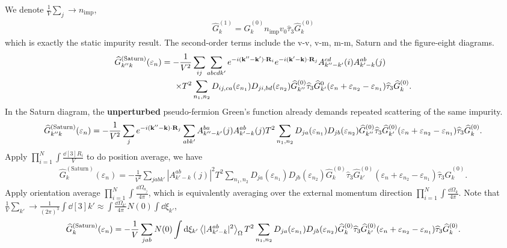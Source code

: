 \documentclass[]{article}
\begin{document}
We denote $\frac{1}{V}\sum_j\rightarrow n_\text{imp}$,
\begin{align}
    \widehat{G}^{(1)}_k = \widehat{G}^{(0)}_{k}n_\text{imp}v_0\widehat{\tau}_3\widehat{G}_k^{(0)}
\end{align}
which is exactly the static impurity result.
The second-order terms include the v-v, v-m, m-m, Saturn and the figure-eight diagrams.
\begin{align}\label{self-energy}
    \widehat{G}^{(\text{Saturn})}_{k''k}(\varepsilon_n)
    =-\frac{1}{V^2}&\sum_{ij}\sum_{abcdk'}
    e^{-i(\vb{k}''-\vb{k}')\cdot\vb{R}_i}
    e^{-i(\vb{k}'-\vb{k})\cdot\vb{R}_j}
    A_{k''-k'}^{cd}(i) A_{k'-k}^{ab}(j)\nonumber\\
    \times
    T^2&\sum_{n_1,n_2}
    D_{ij,ca}(\varepsilon_{n_1})D_{ji,bd}(\varepsilon_{n_2})
    \widehat{G}^{(0)}_{k''}\widehat{\tau}_3
    \widehat{G}^0_{k'}(\varepsilon_n+\varepsilon_{n_2}-\varepsilon_{n_1})
    \widehat{\tau}_3
    \widehat{G}^{(0)}_k.
\end{align}
In the Saturn diagram, the \textbf{unperturbed} pseudo-fermion Green's function already demands repeated scattering of the same impurity.
\begin{align}
    \widehat{G}^{(\text{Saturn})}_{k''k}(\varepsilon_n)
  =-\frac{1}{V^2}\sum_{j}e^{-i(\vb{k}''-\vb{k})\cdot\vb{R}_j}
  \sum_{abk'}
  A_{k''-k'}^{ba}(j)A_{k'-k}^{ab}(j)
  T^2\sum_{n_1,n_2}
  D_{ja}(\varepsilon_{n_1})D_{jb}(\varepsilon_{n_2})
  \widehat{G}^{(0)}_{k''}\widehat{\tau}_3
  \widehat{G}^{(0)}_{k'}(\varepsilon_n+\varepsilon_{n_2}-\varepsilon_{n_1})
  \widehat{\tau}_3
  \widehat{G}^{(0)}_k.
\end{align}
Apply $\prod_{i=1}^{N}\int\frac{\dd[3]{R_i}}{V}$ to do position average, we have
\begin{align}
    \widehat{G}^{(\text{Saturn})}_{k}(\varepsilon_n)
    = -\frac{1}{V^2}\sum_{jabk'}|A^{ab}_{k'-k}(j)|^2
    T^2\sum_{n_1,n_2}
    D_{ja}(\varepsilon_{n_1})D_{jb}(\varepsilon_{n_2})
    \widehat{G}^{(0)}_k\widehat{\tau}_3
    \widehat{G}^{(0)}_{k'}(\varepsilon_n+\varepsilon_{n_2}-\varepsilon_{n_1})
    \widehat{\tau}_3
    \widehat{G}^{(0)}_k.
\end{align}
Apply orientation average $\prod_{i=1}^{N}\int\frac{\dd\Omega_{a_j}}{4\pi}$,
which is equivalently averaging over the external momentum direction $\prod_{i=1}^{N}\int\frac{\dd\Omega_k}{4\pi}$.
Note that $\frac{1}{V}\sum_{k'}\rightarrow\frac{1}{(2\pi)^3}\int\dd[3]{k'}\approx\int\frac{\dd\Omega_{k'}}{4\pi}N(0)\int\dd\xi_{k'}$,
\begin{align}
    \widehat{G}^{(\text{Saturn})}_{k}(\varepsilon_n)
    = -\frac{1}{V}\sum_{jab}N(0)\int\dd\xi_{k'}
    \ev{|A^{ab}_{k'-k}|^2}_\Omega
    T^2\sum_{n_1,n_2}
    D_{ja}(\varepsilon_{n_1})D_{jb}(\varepsilon_{n_2})
    \widehat{G}^{(0)}_k\widehat{\tau}_3
    \widehat{G}^{(0)}_{k'}(\varepsilon_n+\varepsilon_{n_2}-\varepsilon_{n_1})
    \widehat{\tau}_3
    \widehat{G}^{(0)}_k.
\end{align}
\end{document}
